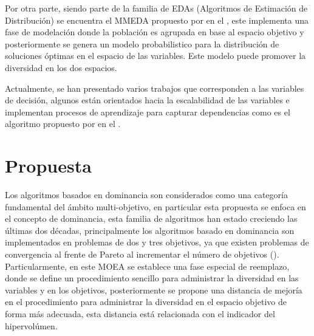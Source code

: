 Por otra parte, siendo parte de la familia de EDAs (Algoritmos de Estimación de Distribución) se encuentra el MMEDA propuesto por \citeauthor{zhou2009approximating} en el \citeyear{zhou2009approximating}, este implementa una fase de modelación donde la población es agrupada en base al espacio objetivo y posteriormente se genera un modelo probabilistico para la distribución de soluciones óptimas en el espacio de las variables.
%
Este modelo puede promover la diversidad en los dos espacios.

%
%
%

Actualmente, se han presentado varios trabajos que corresponden a las variables de decisión, algunos están orientados hacia la escalabilidad de las variables e implementan procesos de aprendizaje para capturar dependencias como es el algoritmo  propuesto por \citeauthor{ma2016multiobjective} en el \citeyear{ma2016multiobjective}.

%

\section{Propuesta}

Los algoritmos basados en dominancia son considerados como una categoría fundamental del ámbito multi-objetivo, en particular esta propuesta se enfoca en el concepto de dominancia, esta familia de algoritmos han estado creciendo las últimas dos décadas, principalmente los algoritmos basado en dominancia son implementados en problemas de dos y tres objetivos, ya que existen problemas de convergencia al frente de Pareto al incrementar el número de objetivos (\cite{Joel:Coello, Joel:Kalyanmoy}).
%
Particularmente, en este MOEA se establece una fase especial de reemplazo, donde se define un procedimiento sencillo para administrar la diversidad en las variables y en los objetivos, posteriormente se propone una distancia de mejoría en el procedimiento para administrar la diversidad en el espacio objetivo de forma más adecuada, esta distancia está relacionada con el indicador del hipervolúmen. 

